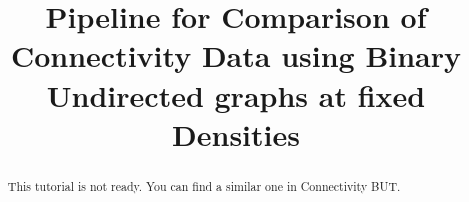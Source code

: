 \documentclass[justified]{tufte-handout}
\title{Pipeline for Comparison of Connectivity Data using Binary Undirected graphs at fixed Densities}
\begin{document}
\maketitle

\begin{abstract}
\noindent
This tutorial is not ready. You can find a similar one in Connectivity BUT.
\end{abstract}
\end{document}

